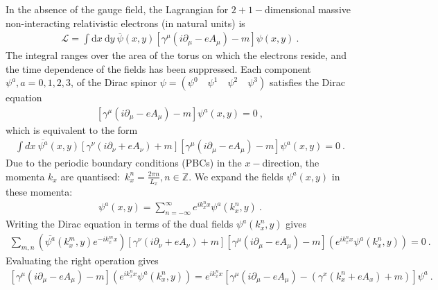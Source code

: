 In the absence of the gauge field, the Lagrangian for \(2+1-\)dimensional massive non-interacting relativistic electrons (in natural units) is
\begin{equation}\begin{aligned}
	\mathcal{L} = \int \mathrm{d}x~\mathrm{d}y~\overline\psi(x,y)\left[\gamma^\mu(i\partial_\mu - eA_\mu) - m \right]\psi(x,y)~.
\end{aligned}\end{equation}
The integral ranges over the area of the torus on which the electrons reside, and the time dependence of the fields has been suppressed. Each component \(\psi^a,a=0,1,2,3\), of the Dirac spinor \(\psi = \left( \psi^0\quad\psi^1\quad\psi^2\quad\psi^3 \right) \) satisfies the Dirac equation
\begin{equation}\begin{aligned}
	\left[\gamma^\mu(i\partial_\mu - eA_\mu) - m\right]\psi^a(x,y) = 0~,
\end{aligned}\end{equation}
which is equivalent to the form
\begin{equation}\begin{aligned}
\int dx~ \overline{\psi^a}(x,y)\left[\gamma^\nu(i\partial_\nu + eA_\nu) + m\right]\left[\gamma^\mu(i\partial_\mu - eA_\mu) - m\right]\psi^a(x,y) = 0~.
\end{aligned}\end{equation}
Due to the periodic boundary conditions (PBCs) in the \(x-\)direction, the momenta \(k_x\) are quantised:~\( k_x^n = \frac{2\pi n}{L_x}, n \in \mathbb{Z}\). We expand the fields \(\psi^a(x,y)\) in these momenta: 
\begin{equation}\begin{aligned}
\psi^a(x,y) = \sum_{n=-\infty}^{\infty} e^{ik_x^n x} \psi^a(k_x^n,y)~.
\end{aligned}\end{equation}
Writing the Dirac equation in terms of the dual fields \(\psi^a(k_x^n,y)\) gives
\begin{equation}\label{DEdual}\begin{aligned}
	\sum_{m,n}\left(\overline{\psi^a}(k_x^m,y) e^{-ik_x^m x}\right) \left[\gamma^\nu(i\partial_\nu + eA_\nu) + m\right]\left[\gamma^\mu(i\partial_\mu - eA_\mu) - m\right]\left(e^{ik_x^n x}\psi^a(k_x^n,y)\right) = 0~.
\end{aligned}\end{equation}
Evaluating the right operation gives
\begin{equation}\begin{aligned}
	\left[\gamma^\mu(i\partial_\mu - eA_\mu) - m\right]\left(e^{ik_x^n x}\psi^a(k_x^n,y)\right) = e^{ik_x^n x}\left[\gamma^\mu(i\partial_\mu - eA_\mu) - \left( \gamma^x (k_x^n + eA_x) + m\right) \right]\psi^a~.
\end{aligned}\end{equation}
